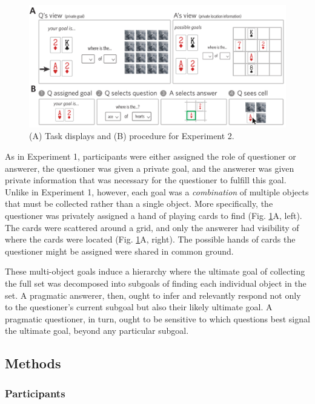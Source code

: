 \documentclass[12pt, floatsintext, jou]{apa6}
\begin{document}
\begin{figure}[tbh!]
\begin{center}
\includegraphics[scale = .7]{Exp2/task.pdf}
\end{center}
\caption{(A) Task displays and (B) procedure for Experiment 2.}
\label{fig:exp2task}
\end{figure}


As in Experiment 1, participants were either assigned the role of questioner or answerer, the questioner was given a private goal, and the answerer was given private information that was necessary for the questioner to fulfill this goal.
Unlike in Experiment 1, however, each goal was a \emph{combination} of multiple objects that must be collected rather than a single object.
More specifically, the questioner was privately assigned a hand of playing cards to find (Fig. \ref{fig:exp2task}A, left). 
The cards were scattered around a grid, and only the answerer had visibility of where the cards were located (Fig. \ref{fig:exp2task}A, right).
The possible hands of cards the questioner might be assigned were shared in common ground.

These multi-object goals induce a hierarchy where the ultimate goal of collecting the full set was decomposed into subgoals of finding each individual object in the set.
A pragmatic answerer, then, ought to infer and relevantly respond not only to the questioner's current subgoal but also their likely ultimate goal.
A pragmatic questioner, in turn, ought to be sensitive to which questions best signal the ultimate goal, beyond any particular subgoal.


\subsection{Methods}
\subsubsection{Participants}
\end{document}
